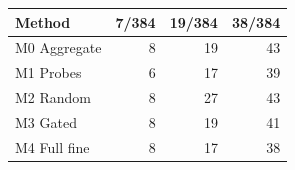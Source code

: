 \begin{tabular}{lrrr}\toprule
Method & 7/384 & 19/384 & 38/384\\\midrule
M0 Aggregate & 8 & 19 & 43 \\
M1 Probes & 6 & 17 & 39 \\
M2 Random & 8 & 27 & 43 \\
M3 Gated & 8 & 19 & 41 \\
M4 Full fine & 8 & 17 & 38 \\
\bottomrule\end{tabular}
